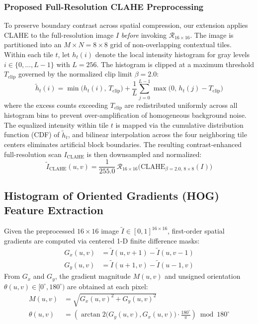 \documentclass[conference]{IEEEtran}
\begin{document}
\subsubsection{Proposed Full-Resolution CLAHE Preprocessing}
To preserve boundary contrast across spatial compression, our extension applies CLAHE to the full-resolution image $I$ \emph{before} invoking $\mathcal{R}_{16 \times 16}$. The image is partitioned into an $M \times N = 8 \times 8$ grid of non-overlapping contextual tiles. Within each tile $t$, let $h_t(i)$ denote the local intensity histogram for gray levels $i \in \{0, \dots, L-1\}$ with $L=256$. The histogram is clipped at a maximum threshold $T_{\text{clip}}$ governed by the normalized clip limit $\beta = 2.0$:
\begin{equation}
    \tilde{h}_t(i) = \min\big(h_t(i), \, T_{\text{clip}}\big) + \frac{1}{L} \sum_{j=0}^{L-1} \max\big(0, \, h_t(j) - T_{\text{clip}}\big)
\end{equation}
where the excess counts exceeding $T_{\text{clip}}$ are redistributed uniformly across all histogram bins to prevent over-amplification of homogeneous background noise. The equalized intensity within tile $t$ is mapped via the cumulative distribution function (CDF) of $\tilde{h}_t$, and bilinear interpolation across the four neighboring tile centers eliminates artificial block boundaries. The resulting contrast-enhanced full-resolution scan $I_{\text{CLAHE}}$ is then downsampled and normalized:
\begin{equation}
    \tilde{I}_{\text{CLAHE}}(u, v) = \frac{1}{255.0} \, \mathcal{R}_{16 \times 16}\big(\text{CLAHE}_{\beta=2.0, \, 8\times 8}(I)\big)
\end{equation}

\subsection{Histogram of Oriented Gradients (HOG) Feature Extraction}
Given the preprocessed $16 \times 16$ image $\tilde{I} \in [0, 1]^{16 \times 16}$, first-order spatial gradients are computed via centered 1-D finite difference masks:
\begin{align}
    G_x(u, v) &= \tilde{I}(u, v+1) - \tilde{I}(u, v-1) \\
    G_y(u, v) &= \tilde{I}(u+1, v) - \tilde{I}(u-1, v)
\end{align}
From $G_x$ and $G_y$, the gradient magnitude $M(u, v)$ and unsigned orientation $\theta(u, v) \in [0^\circ, 180^\circ)$ are obtained at each pixel:
\begin{align}
    M(u, v) &= \sqrt{G_x(u, v)^2 + G_y(u, v)^2} \\
    \theta(u, v) &= \left(\arctan2\big(G_y(u, v), G_x(u, v)\big) \cdot \frac{180^\circ}{\pi}\right) \bmod 180^\circ
\end{align}
\end{document}
